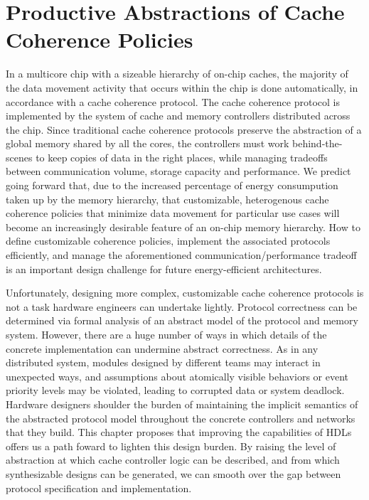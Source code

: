 \chapter{Productive Abstractions of Cache Coherence Policies}
\label{c.coherence}

In a multicore chip with a sizeable hierarchy of on-chip caches,
the majority of the data movement activity that occurs within the chip
is done automatically, in accordance with a cache coherence protocol.
The cache coherence protocol is implemented by the system of cache and memory controllers distributed across the chip.
Since traditional cache coherence protocols preserve the abstraction of a global memory shared by all the cores,
the controllers must work behind-the-scenes to keep copies of data in the right places,
while managing tradeoffs between communication volume, storage capacity and performance.
We predict going forward that, due to the increased percentage of energy consumpution taken up by the memory hierarchy,
that customizable, heterogenous cache coherence policies that minimize data movement for particular use cases
will become an increasingly desirable feature of an on-chip memory hierarchy.
How to define customizable coherence policies, implement the associated protocols efficiently,
and manage the aforementioned communication/performance tradeoff is an important design challenge for future energy-efficient architectures. 

Unfortunately, designing more complex, customizable cache coherence protocols is not a task hardware engineers can undertake lightly.
Protocol correctness can be determined via formal analysis of an abstract model of the protocol and memory system.
However, there are a huge number of ways in which details of the concrete implementation can undermine abstract correctness.
As in any distributed system, modules designed by different teams may interact in unexpected ways,
and assumptions about atomically visible behaviors or event priority levels may be violated,
leading to corrupted data or system deadlock.
Hardware designers shoulder the burden of maintaining the implicit semantics of the abstracted protocol model
throughout the concrete controllers and networks that they build.
This chapter proposes that improving the capabilities of HDLs offers us a path foward to lighten this design burden.
By raising the level of abstraction at which cache controller logic can be described,
and from which synthesizable designs can be generated,
we can smooth over the gap between protocol specification and implementation.

